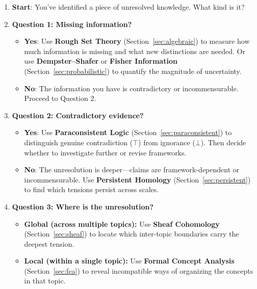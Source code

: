 \documentclass[11pt,letterpaper]{article}
\theoremstyle{definition}
\theoremstyle{remark}
\begin{document}
\begin{enumerate}
\item \textbf{Start}: You've identified a piece of unresolved knowledge. What kind is it?

\item \textbf{Question 1: Missing information?}
   \begin{itemize}
   \item \textbf{Yes}: Use \textbf{Rough Set Theory} (Section~\ref{sec:algebraic}) to measure how much information is missing and what new distinctions are needed.
      Or use \textbf{Dempster--Shafer} or \textbf{Fisher Information} (Section~\ref{sec:probabilistic}) to quantify the magnitude of uncertainty.
   \item \textbf{No}: The information you have is contradictory or incommensurable. Proceed to Question 2.
   \end{itemize}

\item \textbf{Question 2: Contradictory evidence?}
   \begin{itemize}
   \item \textbf{Yes}: Use \textbf{Paraconsistent Logic} (Section~\ref{sec:paraconsistent}) to distinguish genuine contradiction ($\top$) from ignorance ($\bot$). Then decide whether to investigate further or revise frameworks.
   \item \textbf{No}: The unresolution is deeper---claims are framework-dependent or incommensurable. Use \textbf{Persistent Homology} (Section~\ref{sec:persistent}) to find which tensions persist across scales.
   \end{itemize}

\item \textbf{Question 3: Where is the unresolution?}
   \begin{itemize}
   \item \textbf{Global (across multiple topics):} Use \textbf{Sheaf Cohomology} (Section~\ref{sec:sheaf}) to locate which inter-topic boundaries carry the deepest tension.
   \item \textbf{Local (within a single topic):} Use \textbf{Formal Concept Analysis} (Section~\ref{sec:fca}) to reveal incompatible ways of organizing the concepts in that topic.
   \end{itemize}

\end{enumerate}

\newpage

\end{document}
